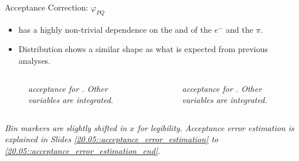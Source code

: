 \begin{frame}{Acceptance Correction: $\varphi_{PQ}$}
    \label{11.56::phipq}

    \begin{itemize}
        \item
             has a highly non-trivial dependence on the \ef{$\theta$} and \ef{$\varphi$} of the $e^-$ and the $\pi$.

        \vspace{6pt}
        \item
            Distribution shows a similar shape as what is expected from previous analyses.
    \end{itemize}

    \vspace{-12pt}
    \begin{columns}
        \begin{column}{.49\linewidth}
            \begin{center}
                \begin{figure}[t]
                    \scriptsize{\textit{
                         acceptance for \ef{$\pi^-$}.
                        Other variables are integrated.
                    }}
                \end{figure}
            \end{center}
        \end{column}

        \begin{column}{.49\linewidth}
            \begin{center}
                \begin{figure}[t]
                    \scriptsize{\textit{
                         acceptance for \ef{$\pi^+$}.
                        Other variables are integrated.
                    }}
                \end{figure}
            \end{center}
        \end{column}
    \end{columns}

    \begin{flushright}
        \tiny{\textit{Bin markers are slightly shifted in $x$ for legibility.}}
        \tiny{\textit{Acceptance error estimation is explained in Slides \textcolor{efd_purple}{\ref{20.05::acceptance_error_estimation}} to \textcolor{efd_purple}{\ref{20.05::acceptance_error_estimation_end}}.}}
    \end{flushright}
\end{frame}
